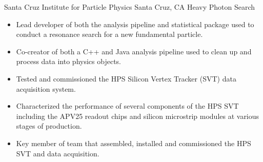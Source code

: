 \documentclass[11pt]{article}
\begin{document}
                        {Santa Cruz Institute for Particle Physics}
                        {Santa Cruz, CA}
                        {Heavy Photon Search}
                        {   
                            \begin{itemize}[label=\textcolor{indigodye}{$\circ$}, noitemsep, nolistsep, leftmargin=0.19\textwidth]
                                \item Lead developer of both the analysis pipeline and statistical package
                                      used to conduct a resonance search for a new fundamental particle.
                              \item Co-creator of both a C++ and Java analysis pipeline used to clean up and process
                                    data into physics objects.
                              \item Tested and commissioned the HPS Silicon Vertex Tracker (SVT) data
                                    acquisition system.
                              \item Characterized the performance of several components of the HPS SVT
                                    including the APV25 readout chips and silicon microstrip modules at various stages
                                    of production.
                              \item Key member of team that assembled, installed and commissioned the HPS SVT
                                    and data acquisition.
                          \end{itemize} 
                      } 
\end{document}
